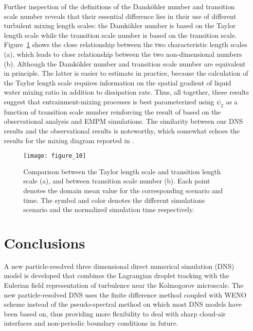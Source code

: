 \documentclass[draft,linenumbers]{agujournal}
\newcommand{\Fig}[1]{Figure~\ref{#1}}
\begin{document}
Further inspection of the definitions of the Damk\"ohler number and transition scale number reveals that their essential difference lies in their use of different turbulent mixing length scales: the Damk\"ohler number is based on the Taylor length scale while the transition scale number is based on the transition scale. { \Fig{fig:TaylorScaleTranScale} shows the close relationship between the two characteristic length scales (a), which leads to  close relationship between the two non-dimensional numbers (b). Although the Damk\"{o}hler number and transition scale number are equivalent in principle. The latter} is easier to estimate in practice, because the calculation of the Taylor length scale requires information on the spatial gradient of liquid water mixing ratio in addition to dissipation rate. Thus, all together, these results suggest that entrainment-mixing processes is best parameterized using $\psi_2$ as a function of transition scale number reinforcing the result of  \citet{Lu2013a} based on the  observational analysis and EMPM simulations. {The similarity between our DNS results and the observational results is noteworthy, which somewhat echoes the results for the mixing diagram reported in \citet{Kumar2017}.}     
\begin{figure}\centering
\texttt{[image: figure\_10]}
\caption{Comparison between the Taylor length scale and transition length scale (a), and between transition scale number (b). Each point denotes the domain mean value for the corresponding scenario and time. The symbol and color denotes the different simulations scenario and the normalized simulation time respectively. \label{fig:TaylorScaleTranScale}}
\end{figure}

\section{Conclusions}\label{conclusion}
A new particle-resolved three dimensional direct numerical simulation (DNS) model is developed that combines the Lagrangian droplet tracking with the Eulerian field representation of turbulence near the Kolmogorov microscale. The new particle-resolved DNS uses the finite difference method coupled with WENO  scheme instead of the pseudo-spectral method on which most DNS models have been based on, thus providing more flexibility to deal with sharp cloud-air interfaces and non-periodic boundary conditions in future.
\end{document}
